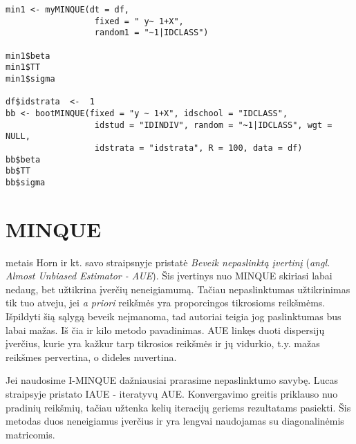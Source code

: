 \documentclass[12pt,a4paper]{article}
\begin{document}
\begin{appendix}
\begin{footnotesize}
\begin{verbatim}
min1 <- myMINQUE(dt = df,
                  fixed = " y~ 1+X",
                  random1 = "~1|IDCLASS")

min1$beta
min1$TT
min1$sigma

df$idstrata  <-  1
bb <- bootMINQUE(fixed = "y ~ 1+X", idschool = "IDCLASS",
                  idstud = "IDINDIV", random = "~1|IDCLASS", wgt = NULL,
                  idstrata = "idstrata", R = 100, data = df)
bb$beta
bb$TT
bb$sigma
\end{verbatim}
\end{footnotesize}
\end{appendix}

\newpage

\listoftables
 \listoffigures
  

\newpage
\section{MINQUE}

 metais Horn ir kt. savo straipsnyje \cite{AUE} pristatė \textit{Beveik nepaslinktą įvertinį} (\textit{angl. Almost Unbiased Estimator - AUE}). Šis įvertinys nuo MINQUE skiriasi labai nedaug, bet užtikrina įverčių neneigiamumą. Tačiau nepaslinktumas užtikrinimas tik tuo atveju, jei \textit{a priori} reikšmės yra proporcingos tikrosioms reikšmėms. Išpildyti šią sąlygą beveik neįmanoma, tad autoriai teigia jog paslinktumas bus labai mažas. Iš čia ir kilo metodo pavadinimas. AUE linkęs duoti dispersijų įverčius, kurie yra kažkur tarp tikrosios reikšmės ir jų vidurkio, t.y. mažas reikšmes pervertina, o dideles nuvertina.

\indent Jei naudosime I-MINQUE dažniausiai prarasime nepaslinktumo savybę. Lucas straipsyje \cite{IAUE} pristato IAUE - iteratyvų AUE. Konvergavimo greitis priklauso nuo pradinių reikšmių, tačiau užtenka kelių iteracijų geriems rezultatams pasiekti. Šis metodas duos neneigiamus įverčius ir yra lengvai naudojamas su diagonalinėmis matricomis.
\end{document}
